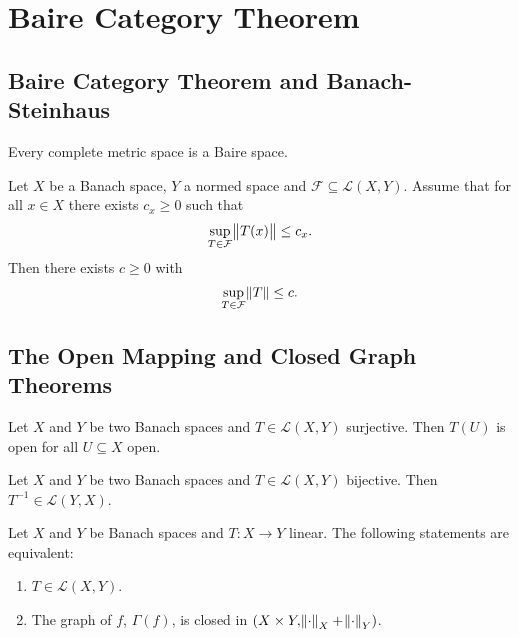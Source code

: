 \section{Baire Category Theorem}
\subsection{Baire Category Theorem and Banach-Steinhaus}
\begin{theorem}
	Every complete metric space is a Baire space.
\end{theorem}

\begin{theorem}
	Let $X$ be a Banach space, $Y$ a normed space and $\mathcal{F} \subseteq \mathcal{L}(X,Y)$. Assume that for all $x \in X$ there exists $c_x \geq 0$ such that 
	\begin{equation}
		\sup_{T \in \mathcal{F}}\norm{T(x)} \leq c_x.
	\end{equation}
	\noindent Then there exists $c \geq 0$ with
	\begin{equation}
		\sup_{T \in \mathcal{F}} \norm{T} \leq c.
	\end{equation}
\end{theorem}

\subsection{The Open Mapping and Closed Graph Theorems}

\begin{theorem}
	Let $X$ and $Y$ be two Banach spaces and $T \in \mathcal{L}(X,Y)$ surjective. Then $T(U)$ is open for all $U \subseteq X$ open.
\end{theorem}

\begin{theorem}
	Let $X$ and $Y$ be two Banach spaces and $T \in \mathcal{L}(X,Y)$ bijective. Then $T^{-1} \in \mathcal{L}(Y,X)$.
\end{theorem}

\begin{theorem}
	Let $X$ and $Y$ be Banach spaces and $T : X \to Y$ linear. The following statements are equivalent:
	\begin{enumerate}[label = (\roman*)]
		\item $T \in \mathcal{L}(X,Y)$.
		\item The graph of $f$, $\Gamma(f)$, is closed in $(X \times Y, \norm{\cdot}_X + \norm{\cdot}_Y)$.
	\end{enumerate}
\end{theorem}


